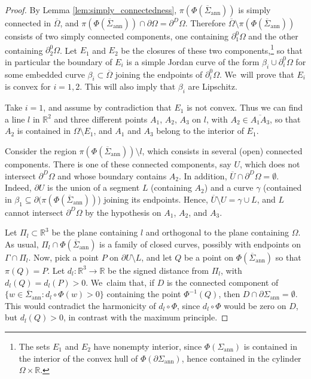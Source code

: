 \documentclass[11pt]{article}
\numberwithin{equation}{section}
\newcommand{\R}{\mathbb{R}}
\let\Om\Omega
\newcommand{\openannulus}{\Sigma_\mathrm{ann}}
\newcommand{\immclosedann}{\Phi({\overline\Sigma}_\mathrm{ann})}
\theoremstyle{definition}
\begin{document}
\begin{proof}
By Lemma \ref{lem:simply_connectedness}, $\pi(\immclosedann)$ is
simply connected in $\overline\Omega$, and $\pi(\immclosedann)\cap \partial\Om=\partial^D\Om$.
Therefore $\overline\Omega\setminus \pi(\immclosedann)$ consists of two simply connected components, one containing $\partial_1^0\Omega$ and the other containing $\partial_2^0\Om$.
Let $E_1$ and $E_2$ be the closures of these two components,\footnote{The sets $E_1$ and $E_2$ have nonempty interior, since $\Phi(\openannulus)$ is contained in the interior of the convex hull of $\Phi(\partial\openannulus)$, hence contained in the cylinder $\Omega\times\R$.}
so that in particular the boundary of $E_i$ is a
simple Jordan curve
of the form $ \beta_i\cup\partial_i^0\Om$ for some
embedded curve $\beta_i\subset\overline\Om$ joining the endpoints of $\partial_i^0\Om$. We~will prove that $E_i$ is convex for $i=1,2$.
This will also imply that $\beta_i$ are Lipschitz.

Take $i=1$, and assume by contradiction that $E_1$ is not convex.
Thus we can find a line $l$ in $\R^2$ and three different points $A_1$, $A_2$, $A_3$ on $l$, with $A_2\in\overline{A_1A_3}$, so that $A_2$ is contained in $\Om\setminus E_1$, and $A_1$ and $A_3$ belong to the interior of $E_1$.

Consider the region $\pi(\immclosedann)\setminus l$, which consists in several (open) connected components. There is one of
these connected components, say $U$,
which does not intersect $\partial^D\Om$ and
whose boundary contains $A_2$. In addition,
$\overline U \cap \partial^D\Om = \emptyset$.
Indeed, $\partial U$ is the union of a segment $L$ (containing $A_2$) and a curve $\gamma$ (contained in $\beta_1\subseteq\partial (\pi(\immclosedann)$) joining its endpoints.
Hence, $\overline U\setminus U=\gamma\cup L$, and $L$ cannot intersect $\partial^D\Om$ by the hypothesis on $A_1$, $A_2$, and $A_3$.

Let $\Pi_l\subset\R^3$ be the
plane containing $l$ and
orthogonal to the plane containing $\Om$.
As usual, $\Pi_l\cap
\immclosedann$ is a family of closed curves, possibly with endpoints on $\Gamma\cap \Pi_l$.
Now, pick a point $P$ on $\partial U\setminus L$, and let $Q$ be a point on $\immclosedann$ so that $\pi(Q)=P$.
Let $d_l:\R^3\to \R$ be the signed distance from $\Pi_l$,
with $d_l(Q)=d_l(P)>0$. We~claim that, if $D$ is the connected component of $\{w\in
\overline\Sigma_\mathrm{ann}:d_l\circ\Phi(w)>0\}$ containing the point $\Phi^{-1}(Q)$, then $D\cap \partial\openannulus=\emptyset$.
This would contradict the harmonicity of $d_l\circ\Phi$, since $d_l\circ\Phi$ would be zero
on $D$, but $d_l(Q)>0$, in contrast with the maximum principle.


\end{proof}
\end{document}

